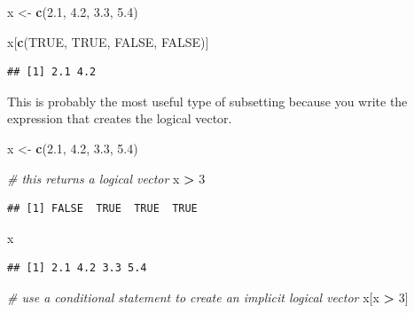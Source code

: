 \documentclass[
]{book}
\newenvironment{Shaded}{\begin{snugshade}}{\end{snugshade}}
\newcommand{\CommentTok}[1]{\textcolor[rgb]{0.56,0.35,0.01}{\textit{#1}}}
\newcommand{\ConstantTok}[1]{\textcolor[rgb]{0.56,0.35,0.01}{#1}}
\newcommand{\DecValTok}[1]{\textcolor[rgb]{0.00,0.00,0.81}{#1}}
\newcommand{\FloatTok}[1]{\textcolor[rgb]{0.00,0.00,0.81}{#1}}
\newcommand{\FunctionTok}[1]{\textcolor[rgb]{0.13,0.29,0.53}{\textbf{#1}}}
\newcommand{\NormalTok}[1]{#1}
\newcommand{\OtherTok}[1]{\textcolor[rgb]{0.56,0.35,0.01}{#1}}
\newcommand{\SpecialCharTok}[1]{\textcolor[rgb]{0.81,0.36,0.00}{\textbf{#1}}}
\begin{document}
\begin{Shaded}
\begin{Highlighting}[]
\NormalTok{x }\OtherTok{\textless{}{-}} \FunctionTok{c}\NormalTok{(}\FloatTok{2.1}\NormalTok{, }\FloatTok{4.2}\NormalTok{, }\FloatTok{3.3}\NormalTok{, }\FloatTok{5.4}\NormalTok{)}

\NormalTok{x[}\FunctionTok{c}\NormalTok{(}\ConstantTok{TRUE}\NormalTok{, }\ConstantTok{TRUE}\NormalTok{, }\ConstantTok{FALSE}\NormalTok{, }\ConstantTok{FALSE}\NormalTok{)]}
\end{Highlighting}
\end{Shaded}

\begin{verbatim}
## [1] 2.1 4.2
\end{verbatim}

This is probably the most useful type of subsetting because you write the expression that creates the logical vector.

\begin{Shaded}
\begin{Highlighting}[]
\NormalTok{x }\OtherTok{\textless{}{-}} \FunctionTok{c}\NormalTok{(}\FloatTok{2.1}\NormalTok{, }\FloatTok{4.2}\NormalTok{, }\FloatTok{3.3}\NormalTok{, }\FloatTok{5.4}\NormalTok{)}

\CommentTok{\# this returns a logical vector}
\NormalTok{x }\SpecialCharTok{\textgreater{}} \DecValTok{3}
\end{Highlighting}
\end{Shaded}

\begin{verbatim}
## [1] FALSE  TRUE  TRUE  TRUE
\end{verbatim}

\begin{Shaded}
\begin{Highlighting}[]
\NormalTok{x}
\end{Highlighting}
\end{Shaded}

\begin{verbatim}
## [1] 2.1 4.2 3.3 5.4
\end{verbatim}

\begin{Shaded}
\begin{Highlighting}[]
\CommentTok{\# use a conditional statement to create an implicit logical vector}
\NormalTok{x[x }\SpecialCharTok{\textgreater{}} \DecValTok{3}\NormalTok{]}
\end{Highlighting}
\end{Shaded}
\end{document}
